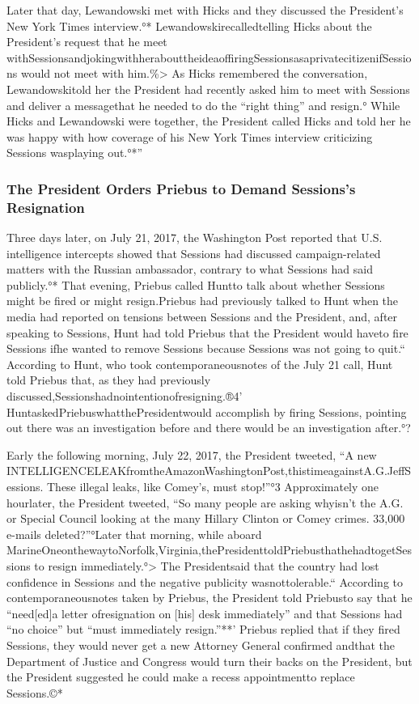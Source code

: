 {Later that day, Lewandowski met with Hicks and they discussed the President’s New York Times interview.°* Lewandowskirecalledtelling Hicks about the President’s request that he meet withSessionsandjokingwithherabouttheideaoffiringSessionsasaprivatecitizenifSessions would not meet with him.\%> As Hicks remembered the conversation, Lewandowskitold her the President had recently asked him to meet with Sessions and deliver a messagethat he needed to do the “right thing” and resign.° While Hicks and Lewandowski were together, the President called Hicks and told her he was happy with how coverage of his New York Times interview criticizing Sessions wasplaying out.°*”

\subsubsection{The President Orders Priebus to Demand Sessions's Resignation}

Three days later, on July 21, 2017, the Washington Post reported that U.S. intelligence intercepts showed that Sessions had discussed campaign-related matters with the Russian ambassador, contrary to what Sessions had said publicly.°* That evening, Priebus called Huntto talk about whether Sessions might be fired or might resign.Priebus had previously talked to Hunt when the media had reported on tensions between Sessions and the President, and, after speaking to Sessions, Hunt had told Priebus that the President would haveto fire Sessions ifhe wanted to remove Sessions because Sessions was not going to quit.“ According to Hunt, who took contemporaneousnotes of the July 21 call, Hunt told Priebus that, as they had previously discussed,Sessionshadnointentionofresigning.®4' HuntaskedPriebuswhatthePresidentwould accomplish by firing Sessions, pointing out there was an investigation before and there would be an investigation after.°?

Early the following morning, July 22, 2017, the President tweeted, “A new INTELLIGENCELEAKfromtheAmazonWashingtonPost,thistimeagainstA.G.JeffSessions. These illegal leaks, like Comey’s, must stop!”°3 Approximately one hourlater, the President tweeted, “So many people are asking whyisn’t the A.G. or Special Council looking at the many Hillary Clinton or Comey crimes. 33,000 e-mails deleted?”°Later that morning, while aboard MarineOneonthewaytoNorfolk,Virginia,thePresidenttoldPriebusthathehadtogetSessions to resign immediately.°> The Presidentsaid that the country had lost confidence in Sessions and the negative publicity wasnottolerable.“ According to contemporaneousnotes taken by Priebus, the President told Priebusto say that he “need[ed]a letter ofresignation on [his] desk immediately” and that Sessions had “no choice” but “must immediately resign.”**’ Priebus replied that if they fired Sessions, they would never get a new Attorney General confirmed andthat the Department of Justice and Congress would turn their backs on the President, but the President suggested he could make a recess appointmentto replace Sessions.©*

}
